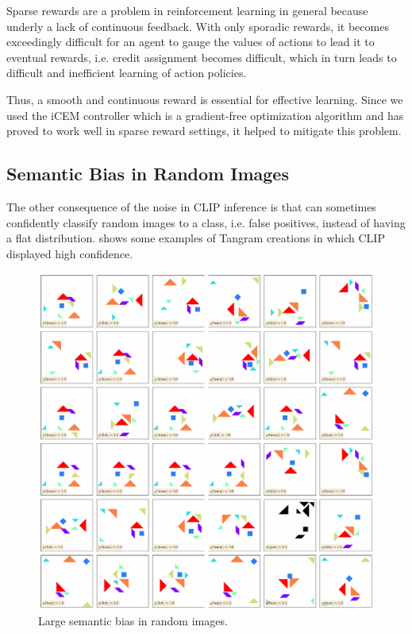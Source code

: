 Sparse rewards are a problem in reinforcement learning in general because underly a lack of continuous feedback. 
With only sporadic rewards, it becomes exceedingly difficult for an agent to gauge the values of actions to lead it to eventual rewards, i.e. credit assignment becomes difficult, which in turn leads to difficult and inefficient learning of action policies.


Thus, a smooth and continuous reward is essential for effective learning.
Since we used the iCEM controller which is a gradient-free optimization algorithm and has proved to work well in sparse reward settings, it helped to mitigate this problem.

\subsection{Semantic Bias in Random Images} %
\label{sec:inference-noise}
The other consequence of the noise in CLIP inference is that can sometimes confidently classify random images to a class, i.e. false positives, instead of having a flat distribution.
 shows some examples of Tangram creations in which CLIP displayed high confidence.

\begin{figure}[h]
    \centering
    \includegraphics[width=\textwidth]{images/adversarial_samples.pdf}
    \caption{Large semantic bias in random images.}
    \label{fig:semantic-bias-random}
\end{figure}

